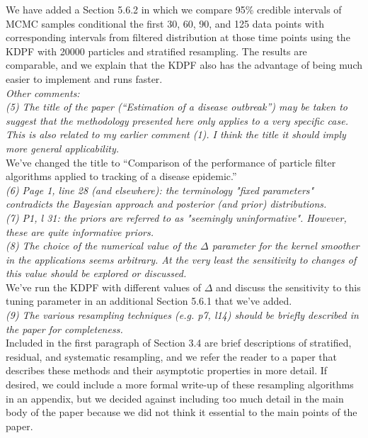 \documentclass{article}
\begin{document}
We have added a Section 5.6.2 in which we compare 95\% credible intervals of MCMC samples conditional the first 30, 60, 90, and 125 data points with corresponding intervals from filtered distribution at those time points using the KDPF with 20000 particles and stratified resampling. The results are comparable, and we explain that the KDPF also has the advantage of being much easier to implement and runs faster. \\

\noindent \emph{Other comments:} \\

\noindent \emph{(5) The title of the paper  (``Estimation of a disease outbreak'') may be taken to suggest that the methodology presented here only applies to a very specific case. This is also related to my earlier comment (1). I think the title  it should imply more general applicability.} \\

We've changed the title to ``Comparison of the performance of particle filter algorithms applied to tracking of a disease epidemic.'' \\

\noindent \emph{(6) Page 1, line 28 (and elsewhere): the terminology "fixed parameters" contradicts the Bayesian approach and posterior (and prior) distributions.} \\

\noindent \emph{(7) P1, l 31: the priors are referred to as "seemingly uninformative". However, these are quite informative priors.} \\

\noindent \emph{(8) The choice of the numerical value of the $\Delta$ parameter for the kernel smoother in the applications seems arbitrary. At the very least the sensitivity to changes of this value should be explored or discussed.} \\

We've run the KDPF with different values of $\Delta$ and discuss the sensitivity to this tuning parameter in an additional Section 5.6.1 that we've added. \\

\noindent \emph{(9) The various resampling techniques (e.g. p7, l14) should be briefly described in the paper for completeness.} \\

Included in the first paragraph of Section 3.4 are brief descriptions of stratified, residual, and systematic resampling, and we refer the reader to a paper that describes these methods and their asymptotic properties in more detail. If desired, we could include a more formal write-up of these resampling algorithms in an appendix, but we decided against including too much detail in the main body of the paper because we did not think it essential to the main points of the paper. \\
\end{document}
